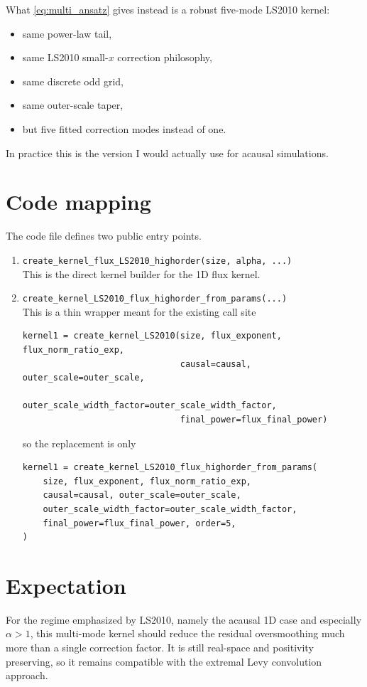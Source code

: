 \documentclass[11pt]{article}
\begin{document}
What \eqref{eq:multi_ansatz} gives instead is a robust five-mode LS2010 kernel:
\begin{itemize}
\item same power-law tail,
\item same LS2010 small-$x$ correction philosophy,
\item same discrete odd grid,
\item same outer-scale taper,
\item but five fitted correction modes instead of one.
\end{itemize}
In practice this is the version I would actually use for acausal simulations.

\section{Code mapping}

The code file defines two public entry points.

\begin{enumerate}
\item
\texttt{create\_kernel\_flux\_LS2010\_highorder(size, alpha, ...)}\\
This is the direct kernel builder for the 1D flux kernel.

\item
\texttt{create\_kernel\_LS2010\_flux\_highorder\_from\_params(...)}\\
This is a thin wrapper meant for the existing call site
\begin{verbatim}
kernel1 = create_kernel_LS2010(size, flux_exponent, flux_norm_ratio_exp,
                               causal=causal, outer_scale=outer_scale,
                               outer_scale_width_factor=outer_scale_width_factor,
                               final_power=flux_final_power)
\end{verbatim}
so the replacement is only
\begin{verbatim}
kernel1 = create_kernel_LS2010_flux_highorder_from_params(
    size, flux_exponent, flux_norm_ratio_exp,
    causal=causal, outer_scale=outer_scale,
    outer_scale_width_factor=outer_scale_width_factor,
    final_power=flux_final_power, order=5,
)
\end{verbatim}
\end{enumerate}

\section{Expectation}

For the regime emphasized by LS2010, namely the acausal 1D case and especially
\(
\alpha>1
\),
this multi-mode kernel should reduce the residual oversmoothing much more than a
single correction factor.  It is still real-space and positivity preserving, so it
remains compatible with the extremal Levy convolution approach.
\end{document}
